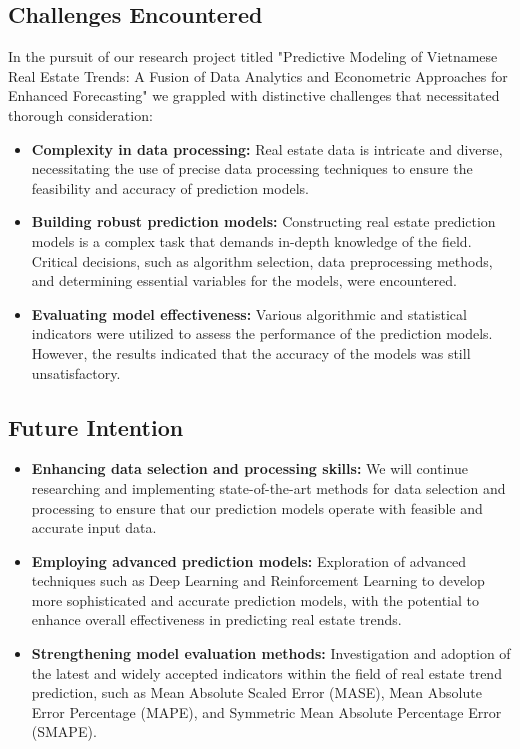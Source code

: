 \documentclass{ieeeojies}
\begin{document}
\subsection{\textbf{Challenges Encountered}}
\hspace{0.3cm}In the pursuit of our research project titled "Predictive Modeling of Vietnamese Real Estate Trends: A Fusion of Data Analytics and Econometric Approaches for Enhanced Forecasting" we grappled with distinctive challenges that necessitated thorough consideration:
\begin{itemize}
    \item \textbf{Complexity in data processing:}
 Real estate data is intricate and diverse, necessitating the use of precise data processing techniques to ensure the feasibility and accuracy of prediction models.
    \item \textbf{Building robust prediction models:}
 Constructing real estate prediction models is a complex task that demands in-depth knowledge of the field. Critical decisions, such as algorithm selection, data preprocessing methods, and determining essential variables for the models, were encountered.
    \item \textbf{Evaluating model effectiveness:}
 Various algorithmic and statistical indicators were utilized to assess the performance of the prediction models. However, the results indicated that the accuracy of the models was still unsatisfactory.
\end{itemize}

\subsection{\textbf{Future Intention}}
\begin{itemize}
    \item \textbf{Enhancing data selection and processing skills:}
We will continue researching and implementing state-of-the-art methods for data selection and processing to ensure that our prediction models operate with feasible and accurate input data.
    \item \textbf{Employing advanced prediction models:}
Exploration of advanced techniques such as Deep Learning and Reinforcement Learning to develop more sophisticated and accurate prediction models, with the potential to enhance overall effectiveness in predicting real estate trends.
    \item \textbf{Strengthening model evaluation methods:}
Investigation and adoption of the latest and widely accepted indicators within the field of real estate trend prediction, such as Mean Absolute Scaled Error (MASE), Mean Absolute Error Percentage (MAPE), and Symmetric Mean Absolute Percentage Error (SMAPE).
\end{itemize}
\end{document}
